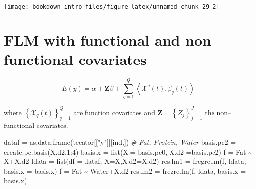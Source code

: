 \documentclass[
]{book}
\newenvironment{Shaded}{\begin{snugshade}}{\end{snugshade}}
\newcommand{\AttributeTok}[1]{\textcolor[rgb]{0.77,0.63,0.00}{#1}}
\newcommand{\CommentTok}[1]{\textcolor[rgb]{0.56,0.35,0.01}{\textit{#1}}}
\newcommand{\DecValTok}[1]{\textcolor[rgb]{0.00,0.00,0.81}{#1}}
\newcommand{\FunctionTok}[1]{\textcolor[rgb]{0.00,0.00,0.00}{#1}}
\newcommand{\NormalTok}[1]{#1}
\newcommand{\OtherTok}[1]{\textcolor[rgb]{0.56,0.35,0.01}{#1}}
\newcommand{\SpecialCharTok}[1]{\textcolor[rgb]{0.00,0.00,0.00}{#1}}
\newcommand{\StringTok}[1]{\textcolor[rgb]{0.31,0.60,0.02}{#1}}
\begin{document}
\begin{center}\texttt{[image: bookdown\_intro\_files/figure-latex/unnamed-chunk-29-2]} \end{center}

\hypertarget{flm-with-functional-and-non-functional-covariates}{%
\section{FLM with functional and non functional covariates}\label{flm-with-functional-and-non-functional-covariates}}

\[E(y)=\alpha+\mathbf{Z}\beta+\sum_{q=1}^Q \left\langle \mathcal{X}^{q}(t),\beta_{q}(t)\right\rangle
\]

where \(\left\{\mathcal{X}_q(t)\right\}_{q=1}^Q\) are function covariates and \(\mathbf{Z}=\left\{{Z_j}\right\}_{j=1}^J\) the non--functional covariates.

\begin{Shaded}
\begin{Highlighting}[]
\NormalTok{dataf }\OtherTok{=} \FunctionTok{as.data.frame}\NormalTok{(tecator[[}\StringTok{"y"}\NormalTok{]][ind,]) }\CommentTok{\# Fat, Protein, Water}
\NormalTok{basis.pc2 }\OtherTok{=} \FunctionTok{create.pc.basis}\NormalTok{(X.d2,}\DecValTok{1}\SpecialCharTok{:}\DecValTok{4}\NormalTok{)}
\NormalTok{basis.x }\OtherTok{=} \FunctionTok{list}\NormalTok{(}\AttributeTok{X =}\NormalTok{ basis.pc0, }\AttributeTok{X.d2 =}\NormalTok{basis.pc2)}
\NormalTok{f }\OtherTok{=}\NormalTok{ Fat }\SpecialCharTok{\textasciitilde{}}\NormalTok{ X}\SpecialCharTok{+}\NormalTok{X.d2}
\NormalTok{ldata }\OtherTok{=} \FunctionTok{list}\NormalTok{(}\AttributeTok{df =}\NormalTok{ dataf, }\AttributeTok{X=}\NormalTok{X,}\AttributeTok{X.d2=}\NormalTok{X.d2)}
\NormalTok{res.lm1 }\OtherTok{=} \FunctionTok{fregre.lm}\NormalTok{(f, ldata, }\AttributeTok{basis.x =}\NormalTok{ basis.x)}
\NormalTok{f }\OtherTok{=}\NormalTok{ Fat }\SpecialCharTok{\textasciitilde{}}\NormalTok{ Water}\SpecialCharTok{+}\NormalTok{X.d2}
\NormalTok{res.lm2 }\OtherTok{=} \FunctionTok{fregre.lm}\NormalTok{(f, ldata, }\AttributeTok{basis.x =}\NormalTok{ basis.x)}
\end{Highlighting}
\end{Shaded}
\end{document}
